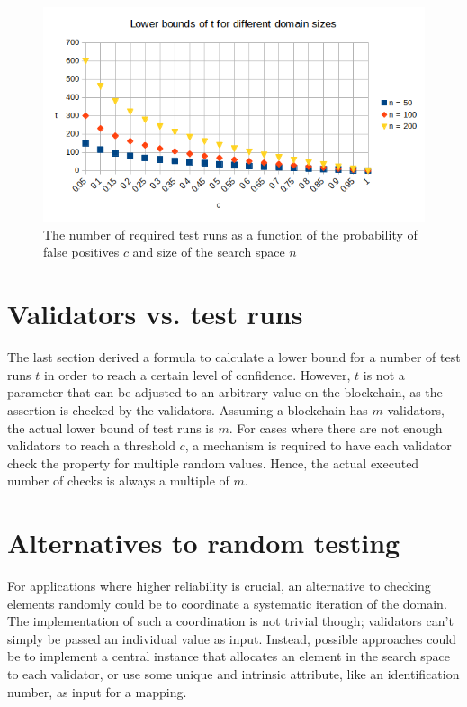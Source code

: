 \begin{figure}[h]
\includegraphics[width=0.95\linewidth]{figures/3-offline/graph_t_c}
\caption{The number of required test runs as a function of the probability of false positives $c$ and size of the search space $n$}
\label{fig:graph_t_c}
\end{figure}

\section{Validators vs. test runs}
The last section derived a formula to calculate a lower bound for a number of test runs $t$ in order to reach a certain level of confidence. However, $t$ is not a parameter that can be adjusted to an arbitrary value on the blockchain, as the assertion is checked by the validators. Assuming a blockchain has $m$ validators, the actual lower bound of test runs is $m$. For cases where there are not enough validators to reach a threshold $c$, a mechanism is required to have each validator check the property for multiple random values. Hence, the actual executed number of checks is always a multiple of $m$.

\section{Alternatives to random testing}\label{sec:alt_random}
For applications where higher reliability is crucial, an alternative to checking elements randomly could be to coordinate a systematic iteration of the domain. The implementation of such a coordination is not trivial though; validators can't simply be passed an individual value as input. Instead, possible approaches could be to implement a central instance that allocates an element in the search space to each validator, or use some unique and intrinsic attribute, like an identification number, as input for a mapping.

